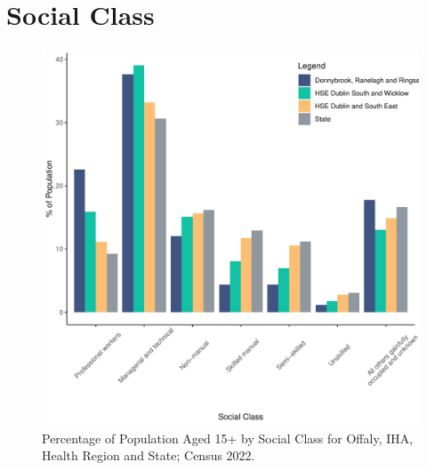 \documentclass{article}
\begin{document}
\section{Social Class}\label{sect:SC}
\begin{figure}[H]
	\centering
	\includegraphics[width = 140mm]{../figures/SocialClassED.pdf}
	\caption{Percentage of Population Aged 15+ by Social Class for Offaly, IHA, Health Region and State; Census 2022.}
	\label{fig:vbnv}
	\end{figure}
\end{document}
